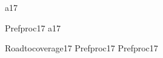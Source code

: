 \begin{circus}
\circchannel a17 \\
\end {circus}
\begin {circus}
\circprocess Prefproc17 \circdef \circbegin
	\circspot
	    a17 \then \Skip \\
	\circend
\end{circus}
\begin{circus}
\circprocess Roadtocoverage17 \circdef Prefproc17 \interleave Prefproc17 \\
\end{circus}
